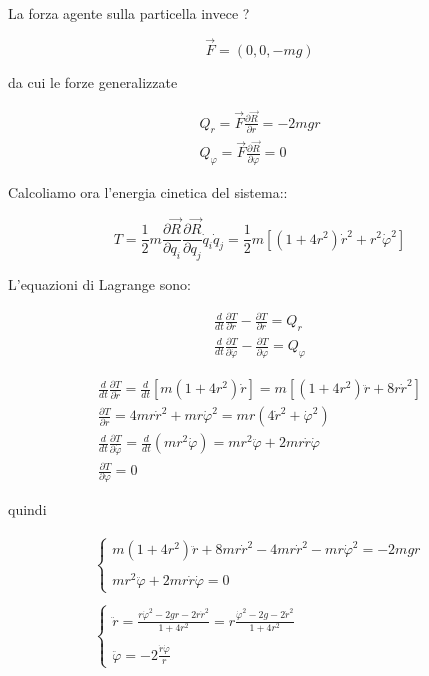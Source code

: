 \documentclass[a4paper,twoside]{article}
\begin{document}
La forza agente sulla particella invece ?

\begin{equation}
\vec F = (0,0, -mg)
\end{equation}

da cui le forze generalizzate

\begin{eqnarray}
Q_r=\vec F \frac{\partial\vec R}{\partial r}=-2mgr
\\
Q_\varphi=\vec F \frac{\partial\vec R}{\partial \varphi}=0
\end{eqnarray}

Calcoliamo ora l'energia cinetica del sistema::

\begin{equation}
T=\frac{1}{2} m \frac{\partial \vec R}{\partial q_i}\frac{\partial \vec R}{\partial q_j} \dot q_i \dot q_j
=\frac{1}{2} m [(1+4r^2)\dot r^2+r^2\dot\varphi ^2]
\end{equation}

L'equazioni di Lagrange sono:

\begin{eqnarray}
\frac{d}{dt}\frac{\partial T}{\partial\dot r}-\frac{\partial T}{\partial r} = Q_r
\\
\frac{d}{dt}\frac{\partial T}{\partial\dot\varphi}-\frac{\partial T}{\partial\varphi} = Q_\varphi
\end{eqnarray}

\begin{eqnarray}
\frac{d}{dt}\frac{\partial T}{\partial\dot r}=\frac{d}{dt}[m(1+4r^2)\dot r]
=m[(1+4r^2)\ddot r+8r\dot r^2]
\\
\frac{\partial T}{\partial r}=4mr\dot r^2+mr\dot\varphi^2=mr(4\dot r^2+\dot\varphi^2)
\\
\frac{d}{dt}\frac{\partial T}{\partial\dot \varphi}=\frac{d}{dt}(mr^2\dot\varphi)
=mr^2\ddot\varphi+2mr\dot r\dot\varphi
\\
\frac{\partial T}{\partial \varphi}=0
\end{eqnarray}

quindi

\begin{equation}
\begin{array}{l}
\left\{
\begin{array}{l}
m(1+4r^2)\ddot r+8mr\dot r^2-4mr\dot r^2-mr\dot\varphi^2=-2mgr
\\
\\
mr^2\ddot\varphi +2mr\dot r\dot\varphi = 0
\end{array}
\right.
\\
\\
\left\{
\begin{array}{l}
\ddot r=\frac{r\dot\varphi^2-2gr-2r\dot r^2}{1+4r^2}
=r\frac{\dot\varphi^2-2g-2\dot r^2}{1+4r^2}
\\
\\
\ddot\varphi  = -2\frac{\dot r\dot\varphi}{r}
\end{array}
\right.
\end{array}
\end{equation}
\end{document}
